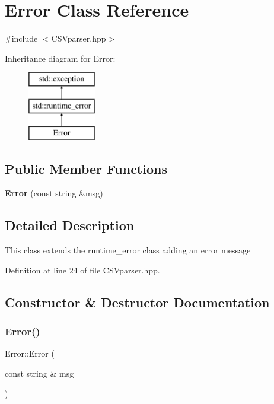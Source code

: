 \section{Error Class Reference}
\label{class_error}


{\ttfamily \#include $<$C\+S\+Vparser.\+hpp$>$}

Inheritance diagram for Error\+:\begin{figure}[H]
\begin{center}
\leavevmode
\includegraphics[height=3.000000cm]{class_error}
\end{center}
\end{figure}
\subsection*{Public Member Functions}
\begin{DoxyCompactItemize}
\item 
\textbf{ Error} (const string \&msg)
\end{DoxyCompactItemize}


\subsection{Detailed Description}
This class extends the runtime\+\_\+error class adding an error message 

Definition at line 24 of file C\+S\+Vparser.\+hpp.



\subsection{Constructor \& Destructor Documentation}
\mbox{\label{class_error_af330fc77babbadebc9a12b3aabfe146f}} 
\subsubsection{Error()}
{\footnotesize\ttfamily Error\+::\+Error (\begin{DoxyParamCaption}\item[{const string \&}]{msg }\end{DoxyParamCaption})\hspace{0.3cm}{\ttfamily [inline]}}

